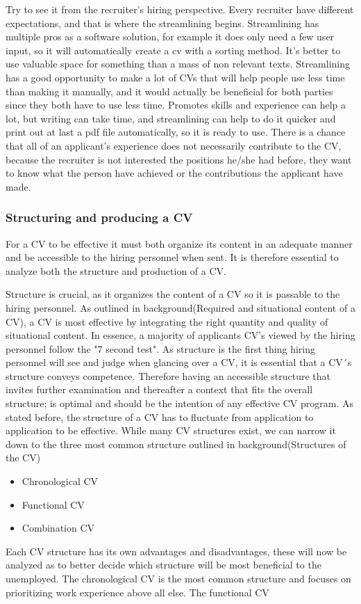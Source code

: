 Try to see it from the recruiter's hiring perspective. Every recruiter have different expectations, 
and that is where the streamlining begins. Streamlining has multiple pros as a software solution,
for example it does only need a few user input, so it will automatically create a cv with a sorting method. 
It's better to use valuable space for something than a mass of non relevant texts.
Streamlining has a good opportunity to make a lot of CVs that will help people use less time than making it manually,
and it would actually be beneficial for both parties since they both have to use less time.
Promotes skills and experience can help a lot, but writing can take time, and streamlining can help to do it quicker 
and print out at last a pdf file automatically, so it is ready to use.
There is a chance that all of an applicant's experience does not necessarily contribute to the CV, 
because the recruiter is not interested the positions he/she had before, they want to know what the person have achieved
or the contributions the applicant have made. 

\subsubsection{Structuring and producing a CV}
For a CV to be effective it must both organize its content in an adequate manner and be accessible to the hiring personnel when sent.
It is therefore essential to analyze both the structure and production of a CV.

Structure is crucial, as it organizes the content of a CV so it is passable to the hiring personnel.
As outlined in background(Required and situational content of a CV), a CV is most effective by integrating the right quantity and quality of situational content.
In essence, a majority of applicants CV's viewed by the hiring personnel follow the "7 second test".
As structure is the first thing hiring personnel will see and judge when glancing over a CV, it is essential that a CV´s structure conveys competence.
Therefore having an accessible structure that invites further examination and thereafter a context that fits the overall structure;
is optimal and should be the intention of any effective CV program.
As stated before, the structure of a CV has to fluctuate from application to application to be effective.
While many CV structures exist, we can narrow it down to the three most common structure outlined in background(Structures of the CV)

\begin{itemize}
  \item Chronological CV
  \item Functional CV
  \item Combination CV
\end{itemize}
Each CV structure has its own advantages and disadvantages, these will now be analyzed as to better decide which structure will be most beneficial to the unemployed.
The chronological CV is the most common structure and focuses on prioritizing work experience above all else. 
The functional CV 


